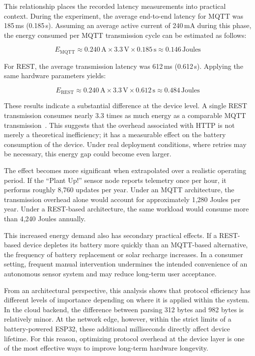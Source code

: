 This relationship places the recorded latency measurements into practical context. During the experiment, the average end-to-end latency for MQTT was 185\,ms (0.185\,s). Assuming an average active current of 240\,mA during this phase, the energy consumed per MQTT transmission cycle can be estimated as follows:

\begin{equation}
E_{\text{MQTT}} \approx 0.240\,\text{A} \times 3.3\,\text{V} \times 0.185\,\text{s} \approx 0.146\,\text{Joules}
\end{equation}

For REST, the average transmission latency was 612\,ms (0.612\,s). Applying the same hardware parameters yields:

\begin{equation}
E_{\text{REST}} \approx 0.240\,\text{A} \times 3.3\,\text{V} \times 0.612\,\text{s} \approx 0.484\,\text{Joules}
\end{equation}

These results indicate a substantial difference at the device level. A single REST transmission consumes nearly 3.3 times as much energy as a comparable MQTT transmission~\cite{jara2023mqtt}. This suggests that the overhead associated with HTTP is not merely a theoretical inefficiency; it has a measurable effect on the battery consumption of the device. Under real deployment conditions, where retries may be necessary, this energy gap could become even larger.

The effect becomes more significant when extrapolated over a realistic operating period. If the ``Plant Up!'' sensor node reports telemetry once per hour, it performs roughly 8,760 updates per year. Under an MQTT architecture, the transmission overhead alone would account for approximately 1,280 Joules per year. Under a REST-based architecture, the same workload would consume more than 4,240 Joules annually.

This increased energy demand also has secondary practical effects. If a REST-based device depletes its battery more quickly than an MQTT-based alternative, the frequency of battery replacement or solar recharge increases. In a consumer setting, frequent manual intervention undermines the intended convenience of an autonomous sensor system and may reduce long-term user acceptance.

From an architectural perspective, this analysis shows that protocol efficiency has different levels of importance depending on where it is applied within the system. In the cloud backend, the difference between parsing 312 bytes and 982 bytes is relatively minor. At the network edge, however, within the strict limits of a battery-powered ESP32, these additional milliseconds directly affect device lifetime. For this reason, optimizing protocol overhead at the device layer is one of the most effective ways to improve long-term hardware longevity.

